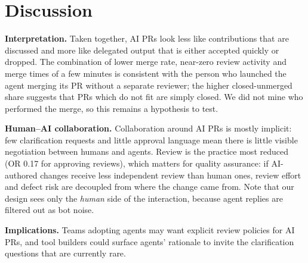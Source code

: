 \documentclass[conference]{IEEEtran}
\begin{document}
\section{Discussion}
\textbf{Interpretation.} Taken together, AI PRs look less like contributions that are discussed and more like delegated output that is either accepted quickly or dropped. The combination of lower merge rate, near-zero review activity and merge times of a few minutes is consistent with the person who launched the agent merging its PR without a separate reviewer; the higher closed-unmerged share suggests that PRs which do not fit are simply closed. We did not mine who performed the merge, so this remains a hypothesis to test.

\textbf{Human--AI collaboration.} Collaboration around AI PRs is mostly implicit: few clarification requests and little approval language mean there is little visible negotiation between humans and agents. Review is the practice most reduced (OR 0.17 for approving reviews), which matters for quality assurance: if AI-authored changes receive less independent review than human ones, review effort and defect risk are decoupled from where the change came from. Note that our design sees only the \emph{human} side of the interaction, because agent replies are filtered out as bot noise.

\textbf{Implications.} Teams adopting agents may want explicit review policies for AI PRs, and tool builders could surface agents' rationale to invite the clarification questions that are currently rare.
\end{document}
